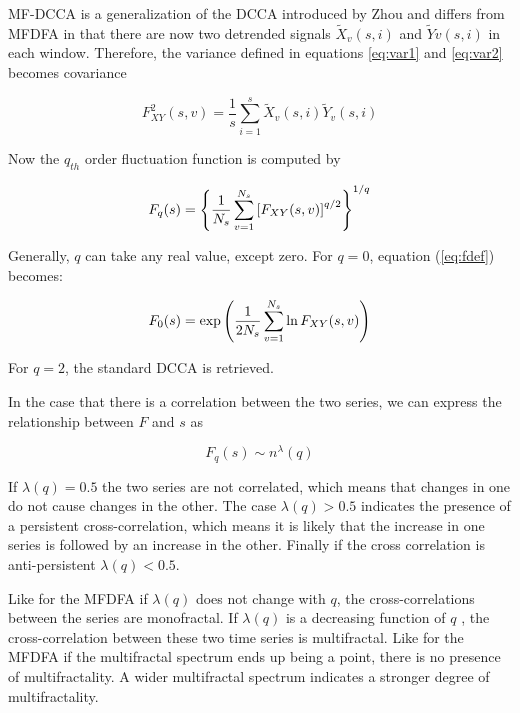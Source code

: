 \documentclass[onecolumn, preprint,aps,amsmath, amssymb, superscriptaddress]{revtex4}
\begin{document}
MF-DCCA is a generalization of the DCCA introduced by Zhou \cite{Zhou} and differs from MFDFA in that there are now two detrended signals  $\tilde{X}_v(s,i)$ and $\tilde{Y}v(s,i)$ in each window. Therefore, the variance defined in equations \ref{eq:var1} and \ref{eq:var2} becomes covariance

\begin{equation}
F_{XY}^2 (s,v)=\frac{1}{s} \sum_{i=1}^s\tilde{X}_v(s,i)\tilde{Y}_v(s,i)
\end{equation}

Now the $q_{th}$ order fluctuation function is computed by

\begin{equation}
F_q(s) =\left\{ {1 \over  N_s} \sum_{v=1}^{ N_s} \left[ F_{XY}(s,v)
\right]^{q/2} \right\}^{1/q} \label{eq:fdef}
\end{equation}

Generally, $q$ can take any real value, except zero. For $q=0$, equation (\ref{eq:fdef}) becomes:

\begin{equation}
F_0(s)= \exp\left( {1 \over  2N_s} \sum_{v=1}^{ N_s}\ln F_{XY}(s,v)\right
) \label{eq:fdef0}
\end{equation}

For $q=2$, the standard DCCA is retrieved.

In the case that there is a correlation between the two series, we can express the relationship between $F$ and $s$ as

\begin{equation}
F_q(s) \sim n^\lambda(q)
\end{equation}

If $\lambda(q)=0.5$ the two series are not correlated, which means that changes in one do not cause changes in the other. The case $\lambda(q) > 0.5$ indicates the presence of a persistent cross-correlation, which means it is likely that the increase in one series is followed by an increase in the other. Finally if the cross correlation is anti-persistent $\lambda(q) < 0.5$.

Like for the MFDFA if $\lambda(q)$ does not change with $q$, the cross-correlations between the series are monofractal. If $\lambda(q)$ is a decreasing function of $q$ , the cross-correlation between these two time series is multifractal. Like for the MFDFA if the multifractal spectrum ends up being a point, there is no presence of multifractality. A wider multifractal spectrum indicates a stronger degree of multifractality.
\end{document}
